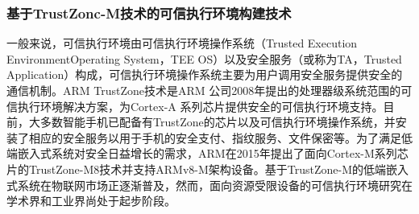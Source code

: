 \documentclass[12pt,a4paper]{ctexart}
\begin{document}
\subsubsection{基于TrustZonc-M技术的可信执行环境构建技术}
一般来说，可信执行环境由可信执行环境操作系统（Trusted Execution EnvironmentOperating System，TEE OS）以及安全服务（或称为TA，Trusted Application）构成，可信执行环境操作系统主要为用户调用安全服务提供安全的通信机制。ARM TrustZone技术是ARM 公司2008年提出的处理器级系统范围的可信执行环境解决方案，为Cortex-A 系列芯片提供安全的可信执行环境支持。目前，大多数智能手机已配备有TrustZone的芯片以及可信执行环境操作系统，并安装了相应的安全服务以用于手机的安全支付、指纹服务、文件保密等。为了满足低端嵌入式系统对安全日益增长的需求，ARM在2015年提出了面向Cortex-M系列芯片的TrustZone-M8技术并支持ARMv8-M架构设备。基于TrustZone-M的低端嵌入式系统在物联网市场正逐渐普及，然而，面向资源受限设备的可信执行环境研究在学术界和工业界尚处于起步阶段。\\
\end{document}
